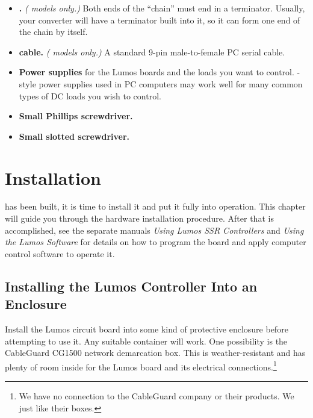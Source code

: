 \documentclass[letterpaper,twoside,onecolumn,openright,final]{memoir}
\begin{document}
\begin{itemize}
	\item	{\bfseries {} .}  \emph{( models only.)}
		Both ends of the  ``chain'' must end in a terminator.
		Usually, your  converter will have a terminator built into it, so it can form one end of the chain
		by itself.

	\item	{\bfseries {} cable.} \emph{( models only.)}
		A standard 9-pin male-to-female PC serial cable.

	\item	{\bfseries Power supplies} for the Lumos boards and the loads you want to control.  -style power
		supplies used in PC computers may work well for many common types of DC loads you wish to control.

	\item	{\bfseries Small Phillips screwdriver.}

	\item	{\bfseries Small slotted screwdriver.}
\end{itemize}

\chapter{Installation}\label{ch:installation}
 has been built, it is time to install it and
put it fully into operation.  This chapter will guide you through the hardware installation
procedure.
After that is accomplished, see the separate manuals \emph{Using Lumos SSR Controllers} 
and \emph{Using the Lumos Software} for 
details on how to program the board and apply computer control software to operate it.

\section{Installing the Lumos Controller Into an Enclosure}
Install the Lumos circuit board into some kind of protective
enclosure before attempting to use it.  Any suitable container will work.  One possibility is the
CableGuard\textsuperscript{\textregistered}
CG1500 network demarcation box.  This is weather-resistant and has plenty of room inside for the
Lumos board and its electrical connections.\footnote{We have no connection to the CableGuard
company or their products. We just like their boxes.}
\end{document}
